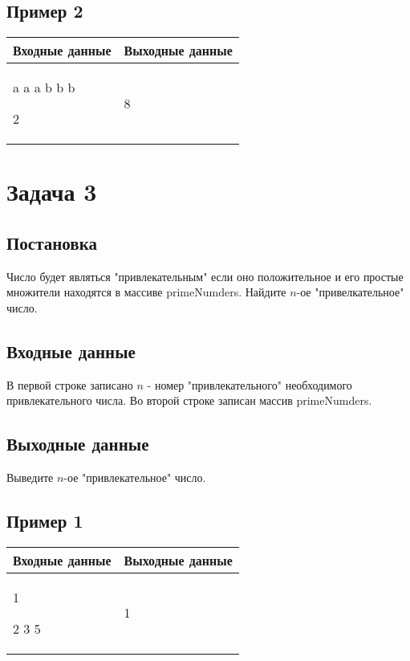 \documentclass[a4]{article}
\begin{document}
\subsection*{Пример 2}
\label{sec:orgd7d348d}

\begin{table}[H]
\begin{center}
\begin{tabular}{|m{4cm}|m{4cm}|}
\hline
Входные данные & Выходные данные \\ \hline
a a a b b b 

2
&
8
\\ \hline
\end{tabular}
\end{center}
\end{table}
\pagebreak
\section*{Задача 3}
\label{sec:org570b899}
\subsection*{Постановка}
\label{sec:orga2b5149}
Число будет являться "привлекательным" если оно положительное и его простые множители находятся в массиве primeNumders.
Найдите \(n\)-ое "привелкательное" число.
\subsection*{Входные данные}
\label{sec:orgeb4908d}
В первой строке записано \(n\) - номер "привлекательного" необходимого привлекательного числа.
\label{sec:orged795e8}
Во второй строке записан массив primeNumders.

\subsection*{Выходные данные}
\label{sec:orged795e8}
Выведите \(n\)-ое "привлекательное" число.
\subsection*{Пример 1}
\label{sec:org6a26c04}

\begin{table}[H]
\begin{center}
\begin{tabular}{|m{4cm}|m{4cm}|}
\hline
Входные данные & Выходные данные \\ \hline
1

2 3 5
&
1 
\\ \hline
\end{tabular}
\end{center}
\end{table}
\end{document}
